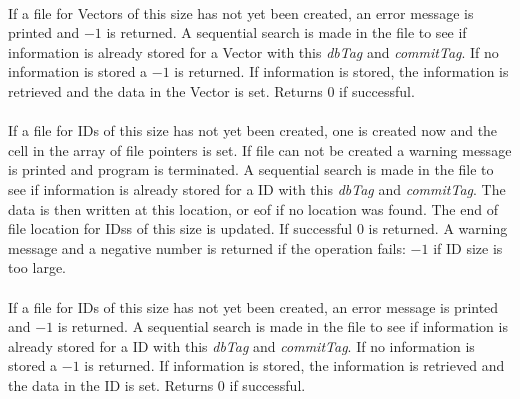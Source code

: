 \\
If a file for Vectors of this size has not yet been created, an error message
is printed and $-1$ is returned.  A sequential search
is made in the file to see if information is already stored for a Vector with
this {\em dbTag} and {\em commitTag}. If no information is stored a
$-1$ is returned. If information is stored, the information is
retrieved and the data in the Vector is set. Returns $0$ if
successful. \\

\\
If a file
for IDs of this size has not yet been created, one is created now
and the cell in the array of file pointers is set. If file can not be
created a warning message is printed and program is terminated. A sequential search
is made in the file to see if information is already stored for a ID with
this {\em dbTag} and {\em commitTag}. The data is then written at this
location, or eof if no location was found. The end of file location
for IDss of this size is updated. If successful $0$ is
returned. A warning message and a negative number is returned if the
operation fails: $-1$ if ID size is too large. \\

\\
If a file for IDs of this size has not yet been created, an error message
is printed and $-1$ is returned.  A sequential search
is made in the file to see if information is already stored for a ID with
this {\em dbTag} and {\em commitTag}. If no information is stored a
$-1$ is returned. If information is stored, the information is
retrieved and the data in the ID is set. Returns $0$ if successful. 